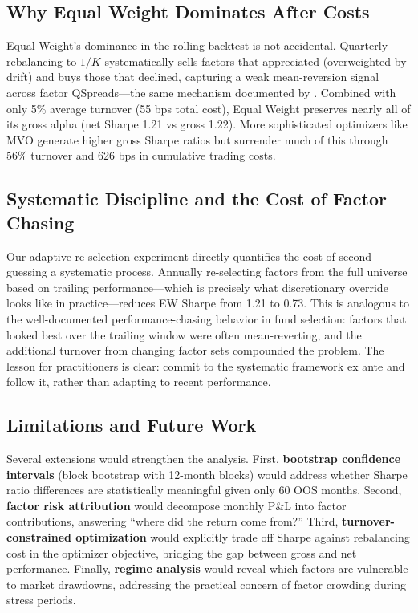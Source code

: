 \documentclass[12pt,a4paper]{article}
\begin{document}
\subsection{Why Equal Weight Dominates After Costs}

Equal Weight's dominance in the rolling backtest is not accidental. Quarterly rebalancing to $1/K$ systematically sells factors that appreciated (overweighted by drift) and buys those that declined, capturing a weak mean-reversion signal across factor QSpreads---the same mechanism documented by \citet{demiguel2009optimal}. Combined with only 5\% average turnover (55 bps total cost), Equal Weight preserves nearly all of its gross alpha (net Sharpe 1.21 vs gross 1.22). More sophisticated optimizers like MVO generate higher gross Sharpe ratios but surrender much of this through 56\% turnover and 626 bps in cumulative trading costs.

\subsection{Systematic Discipline and the Cost of Factor Chasing}

Our adaptive re-selection experiment directly quantifies the cost of second-guessing a systematic process. Annually re-selecting factors from the full universe based on trailing performance---which is precisely what discretionary override looks like in practice---reduces EW Sharpe from 1.21 to 0.73. This is analogous to the well-documented performance-chasing behavior in fund selection: factors that looked best over the trailing window were often mean-reverting, and the additional turnover from changing factor sets compounded the problem. The lesson for practitioners is clear: commit to the systematic framework ex ante and follow it, rather than adapting to recent performance.

\subsection{Limitations and Future Work}

Several extensions would strengthen the analysis. First, \textbf{bootstrap confidence intervals} (block bootstrap with 12-month blocks) would address whether Sharpe ratio differences are statistically meaningful given only 60 OOS months. Second, \textbf{factor risk attribution} would decompose monthly P\&L into factor contributions, answering ``where did the return come from?'' Third, \textbf{turnover-constrained optimization} would explicitly trade off Sharpe against rebalancing cost in the optimizer objective, bridging the gap between gross and net performance. Finally, \textbf{regime analysis} would reveal which factors are vulnerable to market drawdowns, addressing the practical concern of factor crowding during stress periods.
\end{document}
